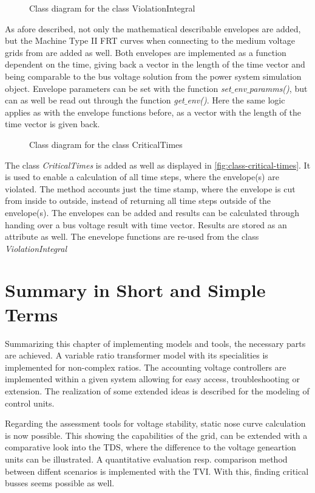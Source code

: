 \begin{figure}[htbp!]
        \centering
        \caption[Class diagram for the class ViolationIntegral]{Class diagram for the class ViolationIntegral}
        \label{fig:class-violation-integral}
\end{figure}

As afore described, not only the mathematical describable envelopes are added, but the Machine Type II \acs{FRT} curves when connecting to the medium voltage grids from \autocite{vde-tar_2018,vde-tar_2023} are added as well.
Both envelopes are implemented as a function dependent on the time, giving back a vector in the length of the time vector and being comparable to the bus voltage solution from the power system simulation object.
Envelope parameters can be set with the function \textit{set$\_$env$\_$paramms()}, but can as well be read out through the function \textit{get$\_$env()}.
Here the same logic applies as with the envelope functions before, as a vector with the length of the time vector is given back.

\begin{figure}[htbp!]
        \centering
        \caption[Class diagram for the class CriticalTimes]{Class diagram for the class CriticalTimes}
        \label{fig:class-critical-times}
\end{figure}

The class \textit{CriticalTimes} is added as well as displayed in \autoref{fig:class-critical-times}.
It is used to enable a calculation of all time steps, where the envelope(s) are violated.
The method accounts just the time stamp, where the envelope is cut from inside to outside, instead of returning all time steps outside of the envelope(s).
The envelopes can be added and results can be calculated through handing over a bus voltage result with time vector.
Results are stored as an attribute as well.
The enevelope functions are re-used from the class \textit{ViolationIntegral}

\section{Summary in Short and Simple Terms}

Summarizing this chapter of implementing models and tools, the necessary parts are achieved.
A variable ratio transformer model with its specialities is implemented for non-complex ratios.
The accounting voltage controllers are implemented within a given system allowing for easy access, troubleshooting or extension.
The realization of some extended ideas is described for the modeling of control units.

Regarding the assessment tools for voltage stability, static nose curve calculation is now possible.
This showing the capabilities of the grid, can be extended with a comparative look into the \acs{TDS}, where the difference to the voltage geneartion units can be illustrated.
A quantitative evaluation resp. comparison method between diffent scenarios is implemented with the \acf{TVI}.
With this, finding critical busses seems possible as well.